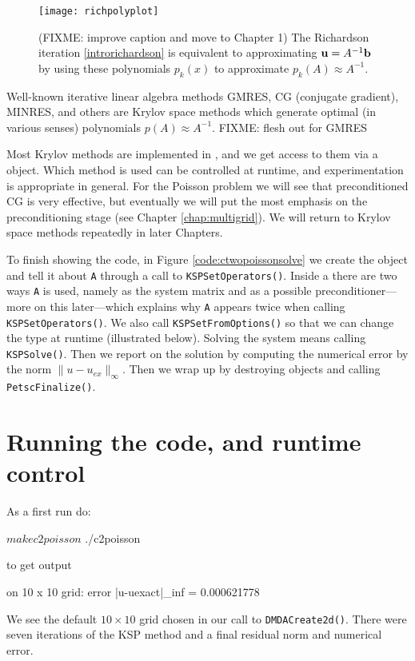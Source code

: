 \begin{figure}
\bigskip
\texttt{[image: richpolyplot]}
\caption{(FIXME: improve caption and move to Chapter 1)  The Richardson iteration \eqref{introrichardson} is equivalent to approximating $\mathbf{u}=A^{-1}\mathbf{b}$ by using these polynomials $p_k(x)$ to approximate $p_k(A)\approx A^{-1}$.}
\label{fig:richpolyplot}
\end{figure}

Well-known iterative linear algebra methods GMRES, CG (conjugate gradient), MINRES, and others \citep{Greenbaum1997,Saad2003} are Krylov space methods which generate optimal (in various senses) polynomials $p(A) \approx A^{-1}$. FIXME: flesh out for GMRES

Most Krylov methods are implemented in \PETSc, and we get access to them via a \pKSP object.  Which method is used can be controlled at runtime, and experimentation is appropriate in general.  For the Poisson problem we will see that preconditioned CG is very effective, but eventually we will put the most emphasis on the preconditioning stage (see Chapter \ref{chap:multigrid}).  We will return to Krylov space methods repeatedly in later Chapters.

To finish showing the code, in Figure \ref{code:ctwopoissonsolve} we create the \pKSP object and tell it about \texttt{A} through a call to \texttt{KSPSetOperators()}.  Inside a \pKSP there are two ways \texttt{A} is used, namely as the system matrix and as a possible preconditioner---more on this later---which explains why \texttt{A} appears twice when calling \texttt{KSPSetOperators()}.  We also call \texttt{KSPSetFromOptions()} so that we can change the \pKSP type at runtime (illustrated below).  Solving the system means calling \texttt{KSPSolve()}.  Then we report on the solution by computing the numerical error by the norm $\|u-u_{ex}\|_\infty$.  Then we wrap up by destroying objects and calling \texttt{PetscFinalize()}.


\section{Running the code, and runtime control}

As a first run do:
\begin{cline}
$ make c2poisson
$ ./c2poisson
\end{cline}
to get output
\begin{cline}
on 10 x 10 grid:  error |u-uexact|_inf = 0.000621778
\end{cline}
We see the default $10\times 10$ grid chosen in our call to \texttt{DMDACreate2d()}. There were seven iterations of the KSP method and a final residual norm and numerical error.

